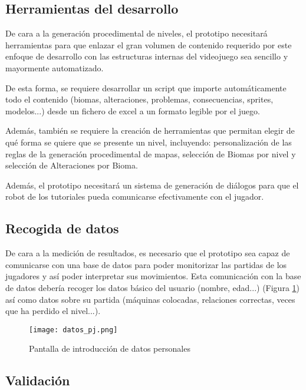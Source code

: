 \subsection{Herramientas del desarrollo}

De cara a la generación procedimental de niveles, el prototipo necesitará herramientas para que enlazar el gran volumen de contenido requerido por este enfoque de desarrollo con las estructuras internas del videojuego sea sencillo y mayormente automatizado. 

De esta forma, se requiere desarrollar un script que importe automáticamente todo el contenido (biomas, alteraciones, problemas, consecuencias, sprites, modelos...) desde un fichero de excel a un formato legible por el juego.

Además, también se requiere la creación de herramientas que permitan elegir de qué forma se quiere que se presente un nivel, incluyendo: personalización de las reglas de la generación procedimental de mapas, selección de Biomas por nivel y selección de Alteraciones por Bioma.

Además, el prototipo necesitará un sistema de generación de diálogos para que el robot de los tutoriales pueda comunicarse efectivamente con el jugador.

\subsection{Recogida de datos}

De cara a la medición de resultados, es necesario que el prototipo sea capaz de comunicarse con una base de datos para poder monitorizar las partidas de los jugadores y así poder interpretar sus movimientos. 
Esta comunicación con la base de datos debería recoger los datos básico  del usuario (nombre, edad...) (Figura \ref{fig:datos}) así como datos sobre su partida (máquinas colocadas, relaciones correctas, veces que ha perdido el nivel...).

\begin{figure}[H]
    \centering
      \texttt{[image: datos\_pj.png]}
    \caption{Pantalla de introducción de datos personales}
    \label{fig:datos}
\end{figure}

\subsection{Validación}

